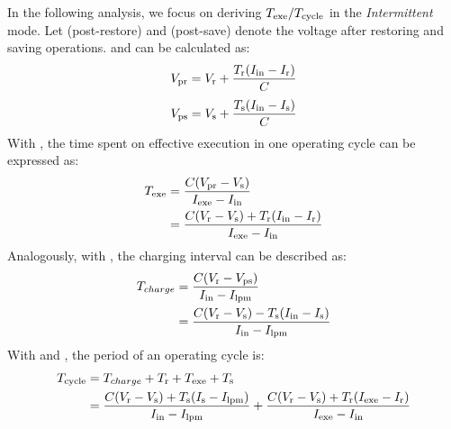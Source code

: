 In the following analysis, we focus on deriving $T_{\text{exe}} / T_{\text{cycle}}$ in the \textit{Intermittent} mode. Let  (post-restore) and  (post-save) denote the voltage after restoring and saving operations.  and  can be calculated as:
\begin{equation}
    V_{\text{pr}} = V_{\text{r}} + \frac{T_{\text{r}} (I_{\text{in}} - I_{\text{r}})}{C}
    \label{eq:vpr}
\end{equation}
\begin{equation}
    V_{\text{ps}} = V_{\text{s}} + \frac{T_{\text{s}} (I_{\text{in}} - I_{\text{s}})}{C}
    \label{eq:vps}
\end{equation}
With , the time spent on effective execution  in one operating cycle can be expressed as:
\begin{equation}
    \begin{aligned}
        T_{\text{exe}} & = \frac{C(V_{\text{pr}} - V_{\text{s}})}{I_{\text{exe}} - I_{\text{in}}} \\
        & = \frac{C(V_{\text{r}} - V_{\text{s}}) + T_{\text{r}} (I_{\text{in}} - I_{\text{r}})} {I_{\text{exe}} - I_{\text{in}}}
    \end{aligned}
    \label{eq:texe}
\end{equation}
Analogously, with , the charging interval can be described as:
\begin{equation}
    \begin{aligned}
        T_{charge} & = \frac{C(V_{\text{r}} - V_{\text{ps}})}{I_{\text{in}} - I_{\text{lpm}}} \\
        & = \frac{C(V_{\text{r}} - V_{\text{s}}) - T_{\text{s}} (I_{\text{in}} - I_{\text{s}})} {I_{\text{in}} - I_{\text{lpm}}}
    \end{aligned}
    \label{eq:tcharge}
\end{equation}
With  and , the period of an operating cycle is:
\begin{equation}
    \begin{aligned}
        T_{\text{cycle}} & = T_{charge} + T_{\text{r}} + T_{\text{exe}} + T_{\text{s}} \\
        & = \frac{C (V_{\text{r}} - V_{\text{s}}) + T_{\text{s}} (I_{\text{s}} - I_{\text{lpm}})}{I_{\text{in}} - I_{\text{lpm}}} + \frac{C (V_{\text{r}} - V_{\text{s}}) + T_{\text{r}} (I_{\text{exe}} - I_{\text{r}})}{I_{\text{exe}} - I_{\text{in}}}
    \end{aligned}
    \label{eq:tperiod}
\end{equation}

